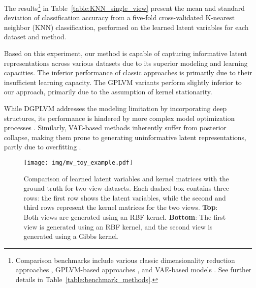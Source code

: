 The results\footnote{%
Comparison benchmarks include various classic dimensionality reduction approaches \citep{wold1987principal, gopalan2015scalable, blei2003latent, bach2002kernel}, GPLVM-based approaches \citep{lalchand2022generalised, li2024preventing, zhang2023bayesian, titsias2010bayesian}, and \MakeUppercase{vae}-based models \citep{kingma2013auto, zhao2020variational,eraslan2019single,zheng2023online}. See further details in Table~\ref{table:benchmark_methods}.} in Table~\ref{table:KNN_single_view} present the mean and standard deviation of classification accuracy from a five-fold cross-validated K-nearest neighbor (KNN) classification, performed on the learned latent variables for each dataset and method. 

Based on this experiment, our method is capable of capturing informative latent representations across various datasets due to its superior modeling and learning capacities. %
The inferior performance of classic approaches is primarily due to their insufficient learning capacity. The GPLVM variants perform slightly inferior to our approach, primarily due to the assumption of kernel stationarity.%

While DGPLVM addresses the modeling limitation by incorporating deep structures, its performance is hindered by more complex model optimization processes \citep{dunlop2018deep}. Similarly, \MakeUppercase{vae}-based methods inherently suffer from posterior collapse, making them prone to generating uninformative latent representations, partly due to overfitting \citep{sonderby2016ladder, bowman2016generating}.


\begin{figure}[t!]
    \vspace{-.1in}
    \centering
    \texttt{[image: img/mv\_toy\_example.pdf]} 
    \vspace{-.05in}
    \caption{
    Comparison of learned latent variables and kernel matrices with the ground truth for two-view datasets. Each dashed box contains three rows: the first row shows the latent variables, while the second and third rows represent the kernel matrices for the two views. 
    \textbf{Top}: Both views are generated using an \MakeUppercase{rbf} kernel. \textbf{Bottom}: The first view is generated using an \MakeUppercase{rbf} kernel, and the second view is generated using a Gibbs kernel.
    \vspace{-.1in}
    }
     
    \label{fig:MV_toy_example}
\end{figure}
%


